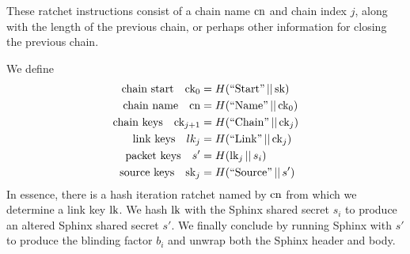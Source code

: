 \documentclass[twoside,letterpaper]{sig-alternate}
\def\mathcomma{,}
\def\mathperiod{.}
\def\mathcomma{}
\def\mathperiod{}
\begin{document}
These ratchet instructions consist of
 a chain name $\textrm{cn}$ and chain index $j$,
along with the length of the previous chain, or
 perhaps other information for closing the previous chain.  

We define
\[ \begin{aligned}
\textrm{chain start}\quad
 \ck_0 &= H(\textrm{``Start''} \,||\, \sk) \mathcomma \\
\textrm{chain name}\quad
 \cn &= H(\textrm{``Name''} \,||\, \ck_0) \mathcomma \\
\textrm{chain keys}\quad
 \ck_{j+1} &= H(\textrm{``Chain''} \,||\, \ck_j) \mathcomma \\
\textrm{link keys}\quad
 lk_j &= H(\textrm{``Link''} \,||\, \ck_j) \mathcomma \\
\textrm{packet keys}\quad 
 s' &= H(\lk_j \,||\, s_i) \mathcomma \\ %
\textrm{source keys}\quad 
 \sk_j &= H(\textrm{``Source''} \,||\, s') \mathperiod \\
\end{aligned} \]
In essence, there is a hash iteration ratchet named by $\textrm{cn}$
from which we determine a link key $\textrm{lk}$.
We hash $\textrm{lk}$ with the Sphinx shared secret $s_i$ to produce
an altered Sphinx shared secret $s'$.
We finally conclude by running Sphinx with $s'$ to produce the 
blinding factor $b_i$ and unwrap both the Sphinx header and body. 

\begin{figure}[th!]
\end{figure}
\end{document}
